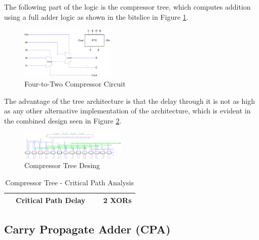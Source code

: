 \documentclass[journal]{IEEEtran}
\begin{document}
The following part of the logic is the compressor tree, which computes addition using a full adder logic as shown in the bitslice in Figure \ref{fig:6}.

\begin{figure}[h!]
  \centering
  \includegraphics[width=0.4\textwidth]{6.png}
  \centering
  \caption{Four-to-Two Compressor Circuit}
  \label{fig:6}
\end{figure}


The advantage of the tree architecture is that the delay through it is not as high as any other alternative implementation of the architecture, which is evident in the combined design seen in Figure \ref{fig:7}.

\begin{figure}[h!]
  \centering
  \includegraphics[width=0.45\textwidth]{7.png}
  \centering
  \caption{Compressor Tree Desing}
  \label{fig:7}
\end{figure}


\begin{table}[!h]
\renewcommand{\arraystretch}{1.5}
\caption{Compressor Tree - Critical Path Analysis}
\label{tab:t4}
\centering
\begin{tabular}{|c|c|}
\hline
~~Critical Path Delay ~~ & 2 XORs\\
\hline
\end{tabular}
\end{table}

\vspace{-10pt}




\subsection{Carry Propagate Adder (CPA)}
\end{document}
